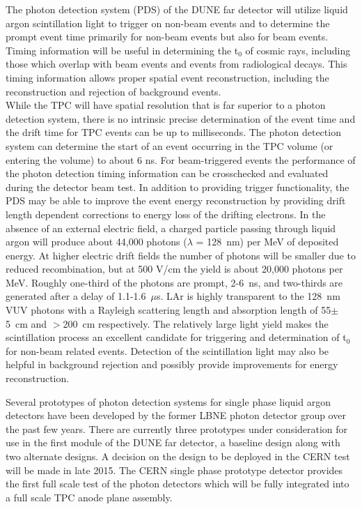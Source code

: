 



The photon detection system (PDS) of the DUNE far detector will utilize liquid argon scintillation light to trigger on non-beam events and to
determine the prompt event time primarily for non-beam events but also for beam events. 
Timing information will be useful in determining the t$_0$ of cosmic rays, including those which 
overlap with beam events and events from radiological decays. This timing information allows proper spatial event reconstruction, including 
the reconstruction and rejection of background events.\\
%
While the TPC will have spatial resolution that is far superior to a photon detection system, there is no intrinsic precise determination of the event time and the drift time for TPC events can be up to milliseconds. The photon detection system can determine the start of an event occurring in the TPC volume (or entering the volume) to about 6 ns. For beam-triggered events the performance of the photon detection timing information can be crosschecked and evaluated during the detector beam test. In addition to providing trigger functionality, the PDS may be able to improve the event energy reconstruction by providing drift length dependent corrections to energy loss of the drifting electrons.
In the absence of an external electric field, a charged particle passing through liquid argon will produce about 44,000 photons ($\lambda$ = 128~nm) per MeV of deposited energy. 
At higher electric drift fields the number of photons will be smaller due to reduced recombination, but at 500 V/cm the yield is about 20,000 photons per MeV. Roughly one-third of the photons are prompt, 2-6~ns, and two-thirds are generated after a delay of 1.1-1.6~$\mu$s. LAr is highly transparent to the 128~nm VUV photons with a Rayleigh scattering length and absorption length of 55$\pm$5~cm \cite{rayleigh} and $>$200~cm \cite{absorption} respectively. The relatively large light yield makes the scintillation process an excellent candidate for triggering and  determination of t$_0$ for non-beam related events. Detection of the scintillation light may also be helpful in background rejection and possibly
provide improvements for energy reconstruction.

Several prototypes of photon detection systems for single phase liquid argon detectors have been developed by the former LBNE photon detector group over the past few years. There are currently three prototypes under consideration for use in the first module of the DUNE far detector, a baseline design along with two alternate designs. A decision on the design to be deployed in the CERN test will be made in late 2015. The CERN single phase prototype detector provides the first full scale test of the photon detectors which will be fully integrated into a 
full scale TPC anode plane assembly. 

